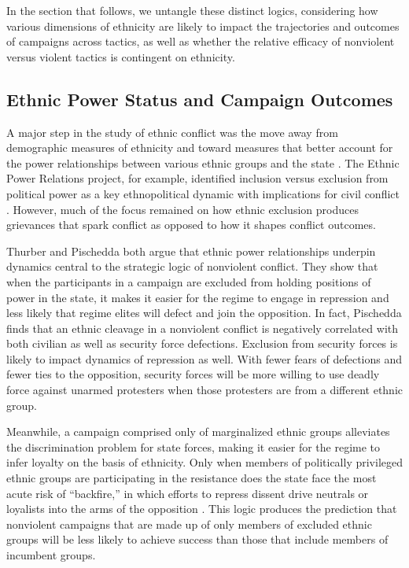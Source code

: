 \documentclass[
  letterpaper,
  DIV=11,
  numbers=noendperiod]{scrartcl}
\begin{document}
In the section that follows, we untangle these distinct logics,
considering how various dimensions of ethnicity are likely to impact the
trajectories and outcomes of campaigns across tactics, as well as
whether the relative efficacy of nonviolent versus violent tactics is
contingent on ethnicity.

\subsection{\texorpdfstring{\textbf{Ethnic Power Status and Campaign
Outcomes}}{Ethnic Power Status and Campaign Outcomes}}\label{ethnic-power-status-and-campaign-outcomes}

A major step in the study of ethnic conflict was the move away from
demographic measures of ethnicity and toward measures that better
account for the power relationships between various ethnic groups and
the state \autocite{Cederman2007,Wimmer2009}. The Ethnic Power Relations
project, for example, identified inclusion versus exclusion from
political power as a key ethnopolitical dynamic with implications for
civil conflict \autocite{Cederman2010,Vogt2015}. However, much of the
focus remained on how ethnic exclusion produces grievances that spark
conflict as opposed to how it shapes conflict outcomes.

Thurber \autocite*{Thurber2018} and Pischedda \autocite*{Pischedda2020}
both argue that ethnic power relationships underpin dynamics central to
the strategic logic of nonviolent conflict. They show that when the
participants in a campaign are excluded from holding positions of power
in the state, it makes it easier for the regime to engage in repression
and less likely that regime elites will defect and join the opposition.
In fact, Pischedda finds that an ethnic cleavage in a nonviolent
conflict is negatively correlated with both civilian as well as security
force defections. Exclusion from security forces is likely to impact
dynamics of repression as well. With fewer fears of defections and fewer
ties to the opposition, security forces will be more willing to use
deadly force against unarmed protesters when those protesters are from a
different ethnic group.

Meanwhile, a campaign comprised only of marginalized ethnic groups
alleviates the discrimination problem for state forces, making it easier
for the regime to infer loyalty on the basis of ethnicity. Only when
members of politically privileged ethnic groups are participating in the
resistance does the state face the most acute risk of ``backfire,'' in
which efforts to repress dissent drive neutrals or loyalists into the
arms of the opposition \autocite{Martin2007}. This logic produces the
prediction that nonviolent campaigns that are made up of only members of
excluded ethnic groups will be less likely to achieve success than those
that include members of incumbent groups.
\end{document}
